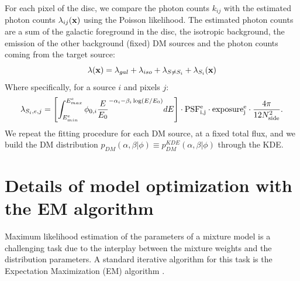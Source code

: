 \documentclass[12pt, a4paper]{article}
\newcommand{\aure}[1]{\textcolor{orange}{[AA: #1]}}
\newcommand{\bx}{{\bf x}}
\begin{document}
For each pixel of the disc, we compare the photon counts $k_{ij}$ with the estimated photon counts $\lambda_{ij}(\bx)$ using the Poisson likelihood. The estimated photon counts are a sum of the galactic foreground in the disc, the isotropic background, the emission of the other background (fixed) DM sources and the photon counts coming from the target source:
\begin{equation}
    \lambda(\bx) = \lambda_{gal} + \lambda_{iso} + \lambda_{S \neq S_i} + \lambda_{S_i}(\bx)
\end{equation}
Where specifically, for a source $i$ and pixels $j$:
\begin{equation}
    \lambda_{S_i, e,j} = \left[\int_{E_{min}^e}^{E_{max}^e} \phi_{0,i}\frac{E}{E_0}^{-\alpha_i - \beta_i\log(E/E_0)} dE\right] \cdot {\rm PSF_{i,j}^e} \cdot {\rm exposure_{j}^e} \cdot \frac{4\pi}{12 N_{\rm side}^2}.
    \label{eq:lambda}
\end{equation}
We repeat the fitting procedure for each DM source, at a fixed total flux, and we build the DM distribution $p_{DM}(\alpha, \beta|\phi)\equiv p_{DM}^{KDE}(\alpha, \beta|\phi)$ through the KDE.

\section{Details of model optimization with the EM algorithm}
\label{sec:EM}

Maximum likelihood estimation of the parameters of a mixture model is a challenging task due to the interplay between the mixture weights and the distribution parameters. 
A standard iterative algorithm for this task is the  Expectation Maximization (EM) algorithm \cite{bishop, hastie2009elements}. 
\end{document}
